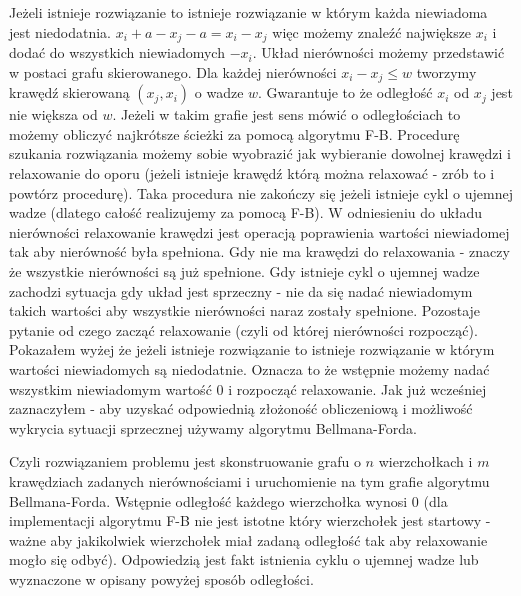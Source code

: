 \documentclass[a4paper,12pt]{article}
\begin{document}
\section{}
Jeżeli istnieje rozwiązanie to istnieje rozwiązanie w którym każda niewiadoma jest niedodatnia. $x_i+a-x_j-a=x_i-x_j$ więc możemy znaleźć największe $x_i$ i dodać do wszystkich niewiadomych $-x_i$. Układ nierówności możemy przedstawić w postaci grafu skierowanego. Dla każdej nierówności $x_i-x_j\leq{w}$ tworzymy krawędź skierowaną $(x_j,x_i)$ o wadze $w$. Gwarantuje to że odległość $x_i$ od $x_j$ jest nie większa od $w$. Jeżeli w takim grafie jest sens mówić o odległościach to możemy obliczyć najkrótsze ścieżki za pomocą algorytmu F-B. Procedurę szukania rozwiązania możemy sobie wyobrazić jak wybieranie dowolnej krawędzi i relaxowanie do oporu (jeżeli istnieje krawędź którą można relaxować - zrób to i powtórz procedurę). Taka procedura nie zakończy się jeżeli istnieje cykl o ujemnej wadze (dlatego całość realizujemy za pomocą F-B). W odniesieniu do układu nierówności relaxowanie krawędzi jest operacją poprawienia wartości niewiadomej tak aby nierówność była spełniona. Gdy nie ma krawędzi do relaxowania - znaczy że wszystkie nierówności są już spełnione. Gdy istnieje cykl o ujemnej wadze zachodzi sytuacja gdy układ jest sprzeczny - nie da się nadać niewiadomym takich wartości aby wszystkie nierówności naraz zostały spełnione. Pozostaje pytanie od czego zacząć relaxowanie (czyli od której nierówności rozpocząć). Pokazałem wyżej że jeżeli istnieje rozwiązanie to istnieje rozwiązanie w którym wartości niewiadomych są niedodatnie. Oznacza to że wstępnie możemy nadać wszystkim niewiadomym wartość 0 i rozpocząć relaxowanie. Jak już wcześniej zaznaczyłem - aby uzyskać odpowiednią złożoność obliczeniową i możliwość wykrycia sytuacji sprzecznej używamy algorytmu Bellmana-Forda.

Czyli rozwiązaniem problemu jest skonstruowanie grafu o $n$ wierzchołkach i $m$ krawędziach zadanych nierównościami i uruchomienie na tym grafie algorytmu Bellmana-Forda. Wstępnie odległość każdego wierzchołka wynosi 0 (dla implementacji algorytmu F-B nie jest istotne który wierzchołek jest startowy - ważne aby jakikolwiek wierzchołek miał zadaną odległość tak aby relaxowanie mogło się odbyć). Odpowiedzią jest fakt istnienia cyklu o ujemnej wadze lub wyznaczone w opisany powyżej sposób odległości.
\end{document}
